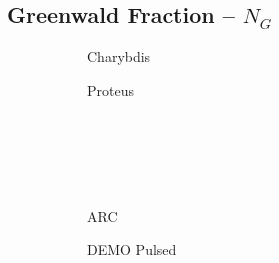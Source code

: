 \clearpage

\newpage

\subsection*{ Greenwald Fraction -- $N_G$ }
  \label{subsection:sensitivity_N_G}

\begin{figure*}[h!]
    \centering
    \hfill
    \begin{subfigure}[t]{0.45\textwidth}
        \centering
    \begin{adjustbox}{width=\textwidth}
      \Large
      
    \end{adjustbox}
        \caption{Charybdis}
    \end{subfigure}
    \hfill
    \begin{subfigure}[t]{0.45\textwidth}
        \centering
    \begin{adjustbox}{width=\textwidth}
      \Large
      
    \end{adjustbox}
        \caption{Proteus}
    \end{subfigure}
    \hfill \hfill ~\\ ~\\ ~\\ ~\\
    \hfill
    \begin{subfigure}[t]{0.45\textwidth}
        \centering
    \begin{adjustbox}{width=\textwidth}
      \Large
      
    \end{adjustbox}
        \caption{ARC}
    \end{subfigure}
    \hfill
    \begin{subfigure}[t]{0.45\textwidth}
        \centering
    \begin{adjustbox}{width=\textwidth}
      \Large
      
    \end{adjustbox}
        \caption{DEMO Pulsed}
    \end{subfigure}
    \hfill \hfill ~\\ ~\\ ~\\ ~\\
    \hfill
    \begin{subfigure}[t]{0.45\textwidth}
        \centering
    \begin{adjustbox}{width=\textwidth}

\end{adjustbox}
\end{subfigure}
\end{figure*}
